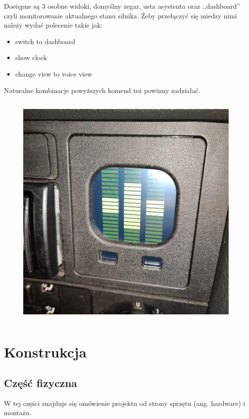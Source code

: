 \documentclass[declaration,shortabstract, inz]{iithesis}
\begin{document}
Dostępne są 3 osobne widoki, domyślny zegar, usta asystenta oraz ,,dashboard'' czyli monitorowanie aktualnego stanu silnika. Żeby przełączyć się miedzy nimi należy wydać polecenie takie jak:
\begin{itemize}
  \item switch to dashboard
  \item show clock
  \item change view to voice view
\end{itemize}
Naturalne kombinacje powyższych komend też powinny zadziałać.


\begin{figure}[htp]
    \centering
    \includegraphics[width=12cm, height=12cm]{images/cocpit_voice.jpg}
    \label{fig:cocpit_voice}
\end{figure}


\chapter{Konstrukcja}
\section{Część fizyczna}
W tej części znajduje się omówienie projektu od strony sprzętu (ang. hardware) i montażu.
\end{document}
